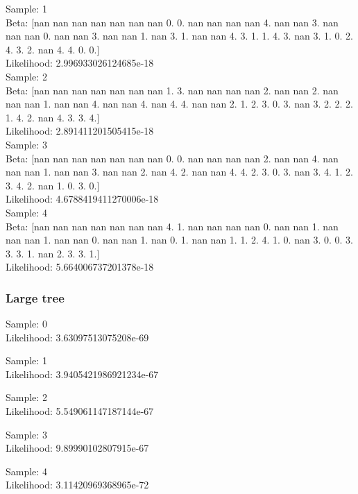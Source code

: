 \documentclass[11pt,a4paper]{article}
\begin{document}
	Sample:  1 \\	Beta:  [nan nan nan nan nan nan nan  0.  0. nan nan nan nan  4. nan nan  3. nan
 nan nan  0. nan nan  3. nan nan  1. nan  3.  1. nan nan  4.  3.  1.  1.
  4.  3. nan  3.  1.  0.  2.  4.  3.  2. nan  4.  4.  0.  0.]\\
	Likelihood:  2.996933026124685e-18\\

	Sample:  2 \\	Beta:  [nan nan nan nan nan nan nan  1.  3. nan nan nan nan  2. nan nan  2. nan
 nan nan  1. nan nan  4. nan nan  4. nan  4.  4. nan nan  2.  1.  2.  3.
  0.  3. nan  3.  2.  2.  2.  1.  4.  2. nan  4.  3.  3.  4.]\\
	Likelihood:  2.891411201505415e-18\\

	Sample:  3\\ 	Beta:  [nan nan nan nan nan nan nan  0.  0. nan nan nan nan  2. nan nan  4. nan
 nan nan  1. nan nan  3. nan nan  2. nan  4.  2. nan nan  4.  4.  2.  3.
  0.  3. nan  3.  4.  1.  2.  3.  4.  2. nan  1.  0.  3.  0.]\\
	Likelihood:  4.6788419411270006e-18\\

	Sample:  4\\ 	Beta:  [nan nan nan nan nan nan nan  4.  1. nan nan nan nan  0. nan nan  1. nan
 nan nan  1. nan nan  0. nan nan  1. nan  0.  1. nan nan  1.  1.  2.  4.
  1.  0. nan  3.  0.  0.  3.  3.  3.  1. nan  2.  3.  3.  1.]\\
	Likelihood:  5.664006737201378e-18\\

\subsubsection{Large tree}

Sample:  0 	\\
	Likelihood:  3.63097513075208e-69

	Sample:  1 	\\
	Likelihood:  3.9405421986921234e-67

	Sample:  2 	\\
	Likelihood:  5.549061147187144e-67

	Sample:  3 	\\
	Likelihood:  9.89990102807915e-67

	Sample:  4\\
	Likelihood:  3.11420969368965e-72
\end{document}
